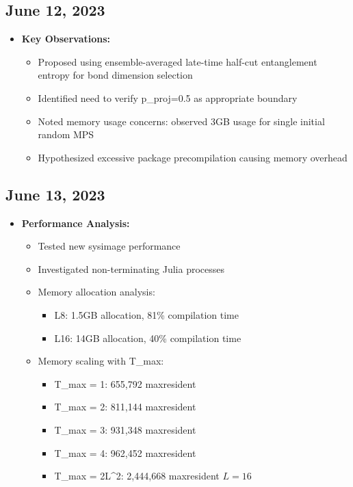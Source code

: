 \documentclass[11pt,a4paper]{article}
\begin{document}
\subsection{June 12, 2023}
\begin{itemize}
    \item \textbf{Key Observations:}
    \begin{itemize}
        \item Proposed using ensemble-averaged late-time half-cut entanglement entropy for bond dimension selection
        \item Identified need to verify p\_proj=0.5 as appropriate boundary
        \item Noted memory usage concerns: observed 3GB usage for single initial random MPS
        \item Hypothesized excessive package precompilation causing memory overhead
    \end{itemize}
\end{itemize}

\subsection{June 13, 2023}
\begin{itemize}
    \item \textbf{Performance Analysis:}
    \begin{itemize}
        \item Tested new sysimage performance
        \item Investigated non-terminating Julia processes
        \item Memory allocation analysis:
            \begin{itemize}
                \item L8: 1.5GB allocation, 81\% compilation time
                \item L16: 14GB allocation, 40\% compilation time
            \end{itemize}
        \item Memory scaling with T\_max:
            \begin{itemize}
                \item T\_max = 1: 655,792 maxresident
                \item T\_max = 2: 811,144 maxresident
                \item T\_max = 3: 931,348 maxresident
                \item T\_max = 4: 962,452 maxresident
                \item T\_max = 2L^2: 2,444,668 maxresident \(L=16\)
            \end{itemize}
    \end{itemize}
\end{itemize}
\end{document}
